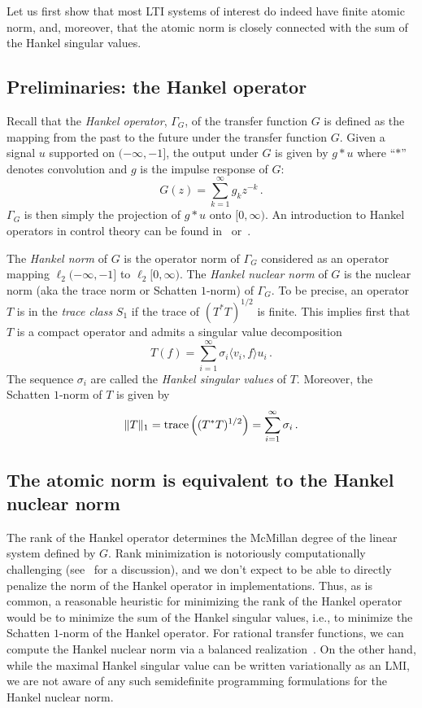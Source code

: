 Let us first show that most LTI systems of interest do indeed have finite atomic
norm, and, moreover, that the atomic norm is closely connected with the sum of
the Hankel singular values.

\subsection{Preliminaries: the Hankel operator}\label{sec:hankel-defs}
Recall that the \emph{Hankel operator}, $\Gamma_G$, of the transfer function $G$
is defined as the mapping from the past to the future under the transfer
function $G$. Given a signal $u$ supported on $(-\infty,-1]$, the output under
$G$ is given by $g * u$ where ``$*$'' denotes convolution and $g$ is the impulse
response of $G$:
\[
	G(z) = \sum_{k=1}^\infty g_k z^{-k}\,.
\]
$\Gamma_G$ is then simply the projection of $g*u$ onto $[0,\infty)$. An
introduction to Hankel operators in control theory can be found in~\cite[Chapter
4]{DullerudPaganiniBook} or~\cite[Chapter 7]{Zhou95}.

The \emph{Hankel norm} of $G$ is the operator norm of $\Gamma_G$ considered as
an operator mapping $\ell_2(-\infty,-1]$ to $\ell_2[0,\infty)$. The \emph{Hankel
nuclear norm} of $G$ is the nuclear norm (aka the trace norm or Schatten
$1$-norm) of $\Gamma_G$. To be precise, an operator $T$ is in the \emph{trace
class} $S_1$ if the trace of $(T^*T)^{1/2}$ is finite. This implies first that
$T$ is a compact operator and admits a singular value decomposition
\begin{equation*}
    T(f) = \sum_{i=1}^\infty \sigma_i \langle v_i, f \rangle u_i \,.
\end{equation*}
The sequence $\sigma_i$ are called the \emph{Hankel singular values} of $T$.
Moreover, the Schatten $1$-norm of $T$ is given by
\begin{equation*}
    \|T\|_1 = \operatorname{trace}\left((T^*T)^{1/2}\right) =
    \sum_{i=1}^\infty \sigma_i\,.
\end{equation*}

\subsection{The atomic norm is equivalent to the Hankel nuclear norm}
\label{sub:equivalence-hankel-atomic}
The rank of the Hankel operator determines the McMillan degree of the linear
system defined by $G$. Rank minimization is notoriously computationally
challenging (see~\cite{Recht10} for a discussion), and we don't expect to be
able to directly penalize the norm of the Hankel operator in implementations.
Thus, as is common, a reasonable heuristic for minimizing the rank of the Hankel
operator would be to minimize the sum of the Hankel singular values, i.e., to
minimize the Schatten $1$-norm of the Hankel operator. For rational transfer
functions, we can compute the Hankel nuclear norm via a balanced
realization~\cite{Zhou95}. On the other hand, while the maximal Hankel singular
value can be written variationally as an LMI, we are not aware of any such
semidefinite programming formulations for the Hankel nuclear norm.

